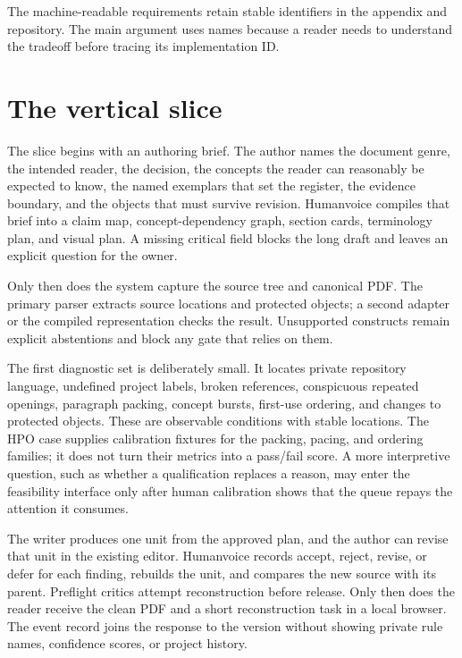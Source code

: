 The machine-readable requirements retain stable identifiers in the appendix
and repository. The main argument uses names because a reader needs to
understand the tradeoff before tracing its implementation ID.

\section{The vertical slice}
\label{sec:proposal}

The slice begins with an authoring brief. The author names the document genre,
the intended reader, the decision, the concepts the reader can reasonably be
expected to know, the named exemplars that set the register, the evidence
boundary, and the objects that must survive revision. Humanvoice compiles that
brief into a claim map, concept-dependency graph, section cards, terminology
plan, and visual plan. A missing critical field blocks the long draft and leaves
an explicit question for the owner.

Only then does the system capture the source tree and canonical PDF. The primary
parser extracts source locations and protected objects; a second adapter or the
compiled representation checks the result. Unsupported constructs remain
explicit abstentions and block any gate that relies on them.

The first diagnostic set is deliberately small. It locates private repository
language, undefined project labels, broken references, conspicuous repeated
openings, paragraph packing, concept bursts, first-use ordering, and changes to
protected objects. These are observable conditions with stable locations. The
HPO case supplies calibration fixtures for the packing, pacing, and ordering
families; it does not turn their metrics into a pass/fail score. A more
interpretive question, such as whether a qualification replaces a reason, may
enter the feasibility interface only after human calibration shows that the
queue repays the attention it consumes.

The writer produces one unit from the approved plan, and the author can revise
that unit in the existing editor. Humanvoice records accept, reject, revise, or
defer for each finding, rebuilds the unit, and compares the new source with its
parent. Preflight critics attempt reconstruction before release. Only then does
the reader receive the clean PDF and a short reconstruction task in a local
browser. The event record joins the response to the version without showing
private rule names, confidence scores, or project history.

